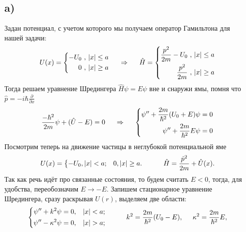 \subsection*{a)}
Задан потенциал, с учетом которого мы получаем оператор Гамильтона для нашей задачи:
\begin{equation*}
	U(x) = \left\{\begin{aligned}
		-U_0 \ , \ &|x| \leq a \\
		0 \ , \ &|x| \geq a
	\end{aligned}
	\right.
	\hspace{0.5 cm}
	\Rightarrow
	\hspace{0.5 cm}
	\hat{H} = \left\{\begin{aligned}
		\frac{p^2}{2m} - U_0 \ , \ &|x| \leq a \\
		\frac{p^2}{2m} \ , \ &|x| \geq a	
	\end{aligned}
	\right.
\end{equation*}
Тогда решаем уравнение Шредингера $\hat{H} \psi = E \psi$ вне и снаружи ямы, помня что $\hat{p} = - i \hbar \frac{\partial}{\partial x}$
\begin{equation*}
\frac{- \hbar^2}{2 m} \psi + (\hat{U} - E) = 0
\hspace{0.5 cm}
\Rightarrow
\hspace{0.5 cm}
\left\{\begin{aligned}
	\psi'' + \frac{2 m}{\hbar^2}(U_0 + E) \psi = 0 \\
	\psi'' + \frac{2 m}{\hbar^2} E \psi = 0
\end{aligned}\right.
\end{equation*}
Посмотрим теперь на движение частицы в неглубокой потенциальной яме 
\begin{equation*}
    U(x) = \left\{\begin{aligned}
        - &U_0, |x| < a;
        &0, |x| \geq a.
    \end{aligned}\right.
    \hspace{10 mm} 
    \hat{H} = \frac{\hat{p}^2}{2m} + \hat{U}(x).
\end{equation*}
Так как речь идёт про связанные состояния, то будем считать $E<0$, тогда, для удобства, переобозначим $E \to -E$.
Запишем стационарное уравнение Шредингера, сразу раскрывая $U(r)$, выделяем две области:
\begin{equation*}
    \left\{\begin{aligned}
        \psi'' + k^2 \psi &= 0,  &|x| < a; \\
        \psi'' - \kappa^2 \psi &= 0, &|x| > a;
    \end{aligned}\right.
    \hspace{10 mm} 
    k^2 = \frac{2m}{\hbar^2} (U_0 - E),
    \hspace{5 mm} 
    \kappa^2 = \frac{2m}{\hbar^2} E,
\end{equation*}
